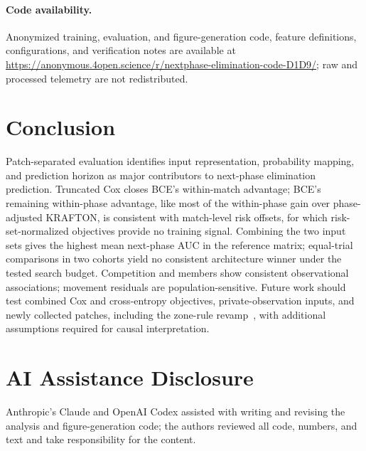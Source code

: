 \documentclass[sigconf,anonymous,nonacm]{acmart}
\newcommand{\artifacturl}{\url{https://anonymous.4open.science/r/nextphase-elimination-code-D1D9/}}
\begin{document}
\paragraph{Code availability.}
Anonymized training, evaluation, and figure-generation code, feature definitions, configurations, and verification notes are available at \artifacturl{}; raw and processed telemetry are not redistributed.

\section{Conclusion}
\label{sec:conclusion}
Patch-separated evaluation identifies input representation, probability mapping, and prediction horizon as major contributors to next-phase elimination prediction. Truncated Cox closes BCE's within-match advantage; BCE's remaining within-phase advantage, like most of the within-phase gain over phase-adjusted KRAFTON, is consistent with match-level risk offsets, for which risk-set-normalized objectives provide no training signal. Combining the two input sets gives the highest mean next-phase AUC in the reference matrix; equal-trial comparisons in two cohorts yield no consistent architecture winner under the tested search budget. Competition and members show consistent observational associations; movement residuals are population-sensitive. Future work should test combined Cox and cross-entropy objectives, private-observation inputs, and newly collected patches, including the zone-rule revamp~\cite{PUBGBlueZone2026}, with additional assumptions required for causal interpretation.

\section*{AI Assistance Disclosure}
Anthropic's Claude and OpenAI Codex assisted with writing and revising the analysis and figure-generation code; the authors reviewed all code, numbers, and text and take responsibility for the content.



\end{document}

